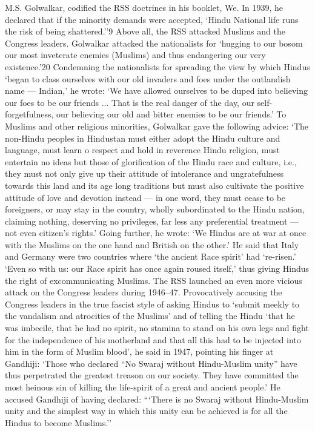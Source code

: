 \begin{multicols}{2}
M.S. Golwalkar, codified the RSS doctrines in his booklet, We. In 1939, he declared that if the minority demands were accepted, `Hindu National life runs the risk of being shattered.''9 Above all, the RSS attacked Muslims and the Congress leaders. Golwalkar attacked the nationalists for `hugging to our bosom our most inveterate enemies (Muslims) and thus endangering our very existence.'20 Condemning the nationalists for spreading the view by which Hindus `began to class ourselves with our old invaders and foes under the outlandish name --- Indian,' he wrote: `We have allowed ourselves to be duped into believing our foes to be our friends ... That is the real danger of the day, our self- forgetfulness, our believing our old and bitter enemies to be our friends.' To Muslims and other religious minorities, Golwalkar gave the following advice: `The non-Hindu peoples in Hindustan must either adopt the Hindu culture and language, must learn o respect and hold in reverence Hindu religion, must entertain no ideas but those of glorification of the Hindu race and culture, i.e., they must not only give up their attitude of intolerance and ungratefulness towards this land and its age long traditions but must also cultivate the positive attitude of love and devotion instead --- in one word, they must cease to be foreigners, or may stay in the country, wholly subordinated to the Hindu nation, claiming nothing, deserving no privileges, far less any preferential treatment --- not even citizen's rights.' Going further, he wrote: `We Hindus are at war at once with the Muslims on the one hand and British on the other.' He said that Italy and Germany were two countries where `the ancient Race spirit' had `re-risen.' `Even so with us: our Race spirit has once again roused itself,' thus giving Hindus the right of excommunicating Muslims. The RSS launched an even more vicious attack on the Congress leaders during 1946--47. Provocatively accusing the Congress leaders in the true fascist style of asking Hindus to `submit meekly to the vandalism and atrocities of the Muslims' and of telling the Hindu `that he was imbecile, that he had no spirit, no stamina to stand on his own legs and fight for the independence of his motherland and that all this had to be injected into him in the form of Muslim blood', he said in 1947, pointing his finger at Gandhiji: `Those who declared ``No Swaraj without Hindu-Muslim unity'' have thus perpetrated the greatest treason on our society. They have committed the most heinous sin of killing the life-spirit of a great and ancient people.' He accused Gandhiji of having declared: ```There is no Swaraj without Hindu-Muslim unity and the simplest way in which this unity can be achieved is for all the Hindus to become Muslims.'' 


\end{multicols}
